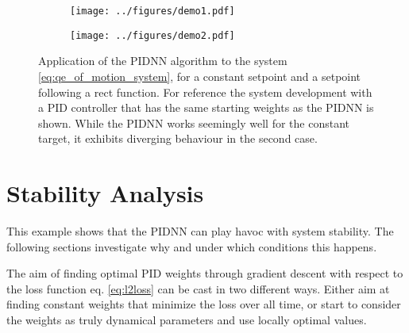 \documentclass{article}
\begin{document}
    \begin{figure}[tb]
    \begin{subfigure}[c]{0.5\textwidth}
        \texttt{[image: ../figures/demo1.pdf]}
        \label{fig:demo:converging}
    \end{subfigure}
    \begin{subfigure}[c]{0.5\textwidth}
        \texttt{[image: ../figures/demo2.pdf]}
        \label{fig:demo:diverging}
    \end{subfigure}
    \caption{Application of the PIDNN algorithm to the system \eqref{eq:qe_of_motion_system}, for a 
    constant setpoint and a setpoint following a rect function. For reference the system development
    with a PID controller that has the same starting weights as the PIDNN is shown. While the PIDNN 
    works seemingly well for the constant target, it exhibits diverging behaviour in the second 
    case.}
    \label{fig:demo}
    \end{figure}














  \section{Stability Analysis}
    This example shows that the PIDNN can play havoc with system stability. The following sections 
    investigate why and under which conditions this happens. 

    The aim of finding optimal PID weights through gradient descent with respect to the loss 
    function eq. \eqref{eq:l2loss} can be cast in two different ways. Either aim at finding constant
    weights that minimize the loss over all time, or start to consider the weights as truly 
    dynamical parameters and use locally optimal values.
\end{document}
